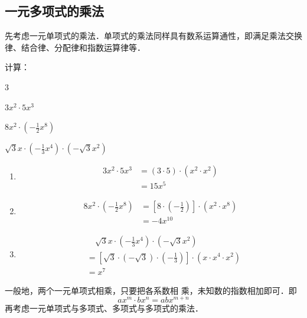 \subsection{一元多项式的乘法}

先考虑一元单项式的乘法．单项式的乘法同样具有数系运算通性，即满足乘法交换律、结合律、分配律和指数运算律等．

\begin{example}
    计算：
    \begin{enumerate}
        \begin{multicols}{3}
              \item $3x^2\cdot 5x^3$
        \item $8x^2\cdot \left(-\frac{1}{2}x^8\right)$
        \item $\sqrt{3}x\cdot \left(-\frac{1}{3}x^4\right)\cdot \left(-\sqrt{3}x^2\right)$
        \end{multicols}
    \end{enumerate}

\end{example}

\begin{solution}
\begin{enumerate}
    \item \begin{align*}
        3x^2\cdot 5x^3&=(3\cdot 5)\cdot (x^2\cdot x^2)\tag{交换、结合律}\\
        &=15x^5
    \end{align*}
    \item \begin{align*}
        8x^2\cdot \left(-\frac{1}{2}x^8\right)&=\left[8\cdot \left(-\frac{1}{2}\right)\right]\cdot (x^2\cdot x^8)\\
        &=-4x^{10}
    \end{align*}
    \item \begin{align*}
      &\quad   \sqrt{3}x\cdot \left(-\frac{1}{3}x^4\right)\cdot \left(-\sqrt{3}x^2\right)\\      
      &= \left[\sqrt{3}\cdot \left(-\sqrt{3}\right)\cdot \left(-\frac{1}{3}\right)\right]\cdot (x\cdot x^4\cdot x^2)\\
      &=x^7 
    \end{align*}   
\end{enumerate} 
\end{solution}

一般地，两个一元单项式相乘，只要把各系数相
乘，未知数的指数相加即可．即
\[ ax^m\cdot bx^n =abx^{m+n}\]
再考虑一元单项式与多项式、多项式与多项式的乘法．

